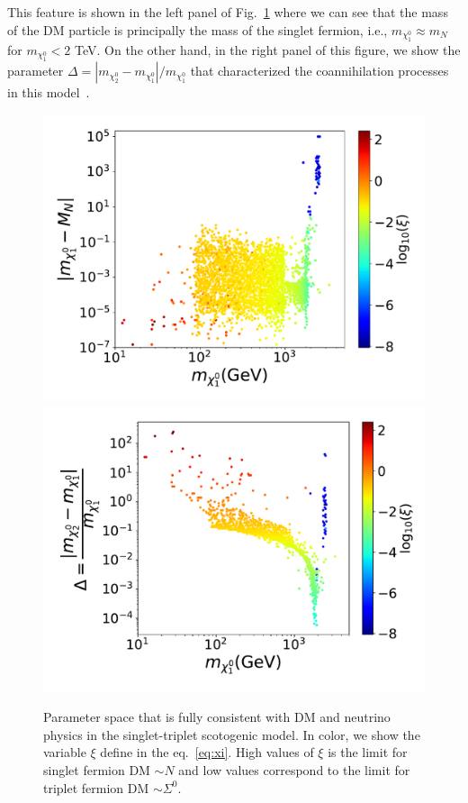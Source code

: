 \documentclass[12pt,letterpaper]{article}
\begin{document}
This feature is shown in the left panel of Fig.~\ref{fig:MN-and-MTF} where we can see that the mass of the DM particle is principally the mass of the singlet fermion, i.e., $m_{\chi_1^0} \approx m_N $ for $m_{\chi_1^0}<2$ TeV. 
On the other hand, in the right panel of this figure, we show the parameter $\Delta=|m_{\chi_2^0}-m_{\chi_1^0}|/m_{\chi_1^0}$ that characterized the coannihilation processes in this model~\cite{Griest:1990kh}. 
\begin{figure}
\begin{center}
\includegraphics[scale=0.43]{mxoMN_with_neutrino_physics}
\includegraphics[scale=0.43]{mxoMTF_with_neutrino_physics}
\caption{Parameter space that is fully consistent with DM and neutrino physics in the singlet-triplet scotogenic model. In color, we show the variable $\xi$ define in the eq.~\ref{eq:xi}. High values of $\xi$ is the limit for singlet fermion DM $\sim N$ and low values correspond to the limit for triplet fermion DM $\sim \Sigma^0$.}
\label{fig:MN-and-MTF}
\end{center}
\end{figure}
\end{document}
